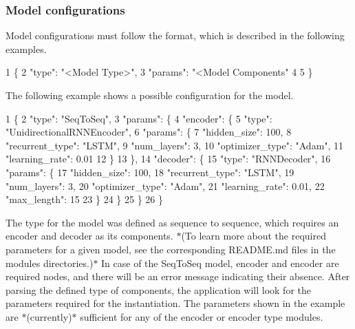 \subsubsection*{Model configurations}

Model configurations must follow the format, which is described in the following examples.


\begin{DoxyCode}
1 \{
2     "type": "<Model Type>",
3     "params": "<Model Components"
4 
5 \}
\end{DoxyCode}


The following example shows a possible configuration for the model.


\begin{DoxyCode}
1 \{
2     "type": "SeqToSeq",
3     "params": \{
4         "encoder":  \{
5             "type": "UnidirectionalRNNEncoder",
6             "params": \{
7                 "hidden\_size": 100,
8                 "recurrent\_type": "LSTM",
9                 "num\_layers": 3,
10                 "optimizer\_type": "Adam",
11                 "learning\_rate": 0.01
12             \}
13         \},
14         "decoder": \{
15             "type": "RNNDecoder",
16             "params": \{
17                 "hidden\_size": 100,
18                 "recurrent\_type": "LSTM",
19                 "num\_layers": 3,
20                 "optimizer\_type": "Adam",
21                 "learning\_rate": 0.01,
22                 "max\_length": 15
23             \}
24         \}
25     \}
26 \}
\end{DoxyCode}
 The type for the model was defined as sequence to sequence, which requires an encoder and decoder as it\textquotesingle{}s components. $\ast$(To learn more about the required parameters for a given model, see the corresponding R\+E\+A\+D\+M\+E.\+md files in the modules directories.)$\ast$ In case of the {\ttfamily Seq\+To\+Seq} model, {\ttfamily encoder} and {\ttfamily encoder} are required nodes, and there will be an error message indicating their absence. After parsing the defined type of components, the application will look for the parameters required for the instantiation. The parameters shown in the example are $\ast$(currently)$\ast$ sufficient for any of the {\ttfamily encoder} or {\ttfamily encoder} type modules. 